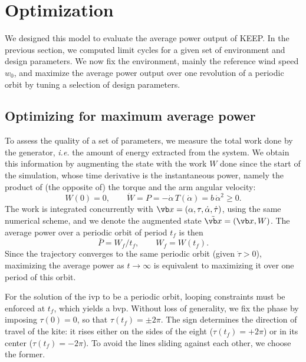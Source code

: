 \section{Optimization} \label{sec:optimization}

We designed this model to evaluate the average power output of KEEP.
In the previous section, we computed limit cycles for a given set of environment and design parameters.
We now fix the environment, mainly the reference wind speed \(w_0\), and maximize the average power output over one revolution of a periodic orbit by tuning a selection of design parameters.

\subsection{Optimizing for maximum average power} \label{sec:opt-power}

To assess the quality of a set of parameters, we measure the total work done by the generator, \emph{i.e.} the amount of energy extracted from the system.
We obtain this information by augmenting the state with the work \(W\) done since the start of the simulation, whose time derivative is the instantaneous power, namely the product of (the opposite of) the torque and the arm angular velocity:
\begin{equation} \label{eq:work}
    W(0) = 0, \qquad
    \dot W = P = - \dot \alpha \, T(\dot \alpha) = b \, \dot \alpha^2 \geq 0.
\end{equation}
The work is integrated concurrently with \(\vb x = (\alpha, \tau, \dot \alpha, \dot \tau)\), using the same numerical scheme, and we denote the augmented state \(\tilde{\vb x} = (\vb x, W)\).
The average power over a periodic orbit of period \(t_f\) is then
\begin{equation}
    \bar P = W_f / t_f, \qquad W_f = W(t_f).
\end{equation}
Since the trajectory converges to the same periodic orbit (given \(\dot \tau > 0\)), maximizing the average power as \(t \to \infty\) is equivalent to maximizing it over one period of this orbit.

For the solution of the \ac{ivp} to be a periodic orbit, looping constraints must be enforced at \(t_f\), which yields a \ac{bvp}.
Without loss of generality, we fix the phase by imposing \(\tau(0) = 0\), so that \(\tau(t_f) = \pm 2\pi\).
The sign determines the direction of travel of the kite: it rises either on the sides of the eight (\(\tau(t_f) = +2\pi\)) or in its center (\(\tau(t_f) = -2\pi\)).
To avoid the lines sliding against each other, we choose the former.

